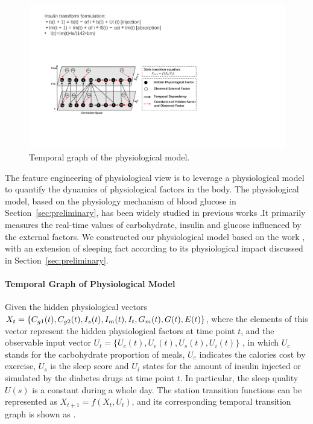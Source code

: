 \begin{figure}[t]
  \centering
  \includegraphics[width=0.9\columnwidth]{./img/Physiological_correlation1.pdf}
  \caption{Temporal graph of the physiological model.}
  \label{fig:phymodel}
\end{figure}
The feature engineering of physiological view is to leverage a physiological model to quantify the dynamics of physiological factors in the body. The 
physiological model, based on the physiology mechanism of blood glucose in Section~\ref{sec:preliminary}, has been widely studied in previous works \cite{bib:briegel2002nonlinear,bib:duke2010intelligent, bib:plis2014machine}.It primarily measures the real-time values of carbohydrate, insulin and glucose influenced by the external factors. We constructed our physiological model based on the work \cite{bib:duke2010intelligent},
with an extension of sleeping fact according to its physiological impact discussed in Section~\ref{sec:preliminary}.

\paragraph{Temporal Graph of Physiological Model}
Given the hidden physiological vectors $X_{t}=\{C_{g1}(t), C_{g2}(t),\\ I_{s}(t),I_{m}(t), I_{t}, G_{m}(t), G(t), E(t)\}$, where the elements of this vector represent
the hidden physiological factors at time point $t$, and the observable input vector $U_{t}=\{U_{c}(t), U_{e}(t), U_{s}(t), U_{i}(t)\}$ , in which $U_{c}$ stands for the 
carbohydrate proportion of meals, $U_{e}$ indicates the calories cost by exercise,  $U_{s}$ is the sleep score and $U_{i}$ states for the amount of insulin injected or simulated 
by the diabetes drugs  at time point $t$. In particular, the sleep quality $U(s)$ is a constant during a whole day.
The station transition functions can be represented as $X_{t+1}=f(X_t, U_t)$, and its corresponding
temporal transition graph is shown as .  %

